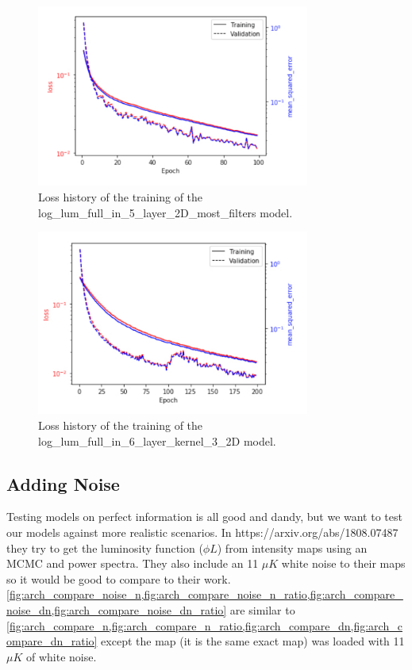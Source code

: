 \documentclass{article}
\begin{document}
			\begin{figure}[H]
				\centering
				\includegraphics[width=0.8\textwidth]{log_lum_full_in_5_layer_2D_most_filters_history.pdf}
				\caption{Loss history of the training of the log\_lum\_full\_in\_5\_layer\_2D\_most\_filters model.}
				\label{fig:log_lum_full_in_5_layer_2D_most_filters_history}
			\end{figure}

			\begin{figure}[H]
				\centering
				\includegraphics[width=0.8\textwidth]{log_lum_full_in_6_layer_kernel_3_2D_history.pdf}
				\caption{Loss history of the training of the log\_lum\_full\_in\_6\_layer\_kernel\_3\_2D model.}
				\label{fig:log_lum_full_in_6_layer_kernel_3_2D_history}
			\end{figure}

		\subsection{Adding Noise} \label{sec:noise}

			Testing models on perfect information is all good and dandy, but we want to test our models against more realistic scenarios.  In https://arxiv.org/abs/1808.07487 they try to get the luminosity function (\(\phi L\)) from intensity maps using an MCMC and power spectra.  They also include an 11 \(\mu K\) white noise to their maps so it would be good to compare to their work.  \cref{fig:arch_compare_noise_n,fig:arch_compare_noise_n_ratio,fig:arch_compare_noise_dn,fig:arch_compare_noise_dn_ratio} are similar to \cref{fig:arch_compare_n,fig:arch_compare_n_ratio,fig:arch_compare_dn,fig:arch_compare_dn_ratio} except the map (it is the same exact map) was loaded with 11 \(\mu K\) of white noise.
\end{document}
